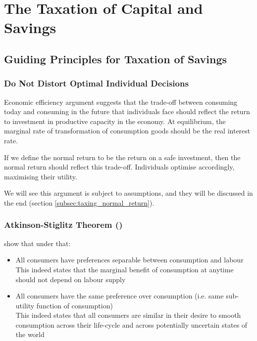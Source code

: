 \chapter{The Taxation of Capital and Savings}


\section{Guiding Principles for Taxation of Savings}

    \subsection{Do Not Distort Optimal Individual Decisions}

        Economic efficiency argument suggests that the trade-off between consuming today and consuming in the future that individuals face should reflect the return to investment in productive capacity in the economy. At equilibrium, the marginal rate of transformation of consumption goods should be the real interest rate.

        If we define the normal return to be the return on a safe investment, then the normal return should reflect this trade-off. Individuals optimise accordingly, maximising their utility. 

        We will see this argument is subject to assumptions, and they will be discussed in the end (section \ref{subsec:taxing_normal_return}).

    \subsection{Atkinson-Stiglitz Theorem (\cite{atkinson_design_1976})}

        \cite{atkinson_design_1976} show that under  that:
        \begin{itemize}
            \item All consumers have preferences separable between consumption and labour\\
            This indeed states that the marginal benefit of consumption at anytime should not depend on labour supply
            \item All consumers have the same preference over consumption (i.e. same sub-utility function of consumption)\\
            This indeed states that all consumers are similar in their desire to smooth consumption across their life-cycle and across potentially uncertain states of the world
        \end{itemize}

